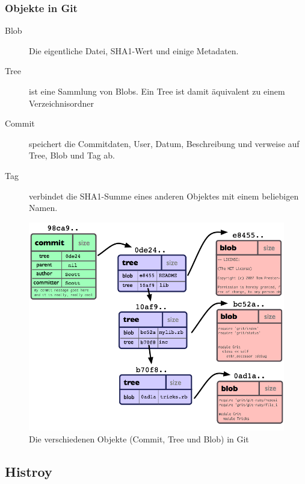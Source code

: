 \documentclass{beamer}
\begin{document}
\begin{frame}\frametitle{Objekte in Git}
\begin{description}
\item[Blob] Die eigentliche Datei, SHA1-Wert und einige Metadaten.
\item[Tree] ist eine Sammlung von Blobs. Ein Tree ist damit äquivalent zu einem Verzeichnisordner
\item[Commit] speichert die Commitdaten, User, Datum, Beschreibung und verweise auf Tree, Blob und Tag ab.
\item[Tag] verbindet die SHA1-Summe eines anderen Objektes mit einem beliebigen Namen. 
\end{description}

\begin{figure}
\includegraphics[scale=0.35]{Bilder/objects-example} 
{\tiny \caption{Die verschiedenen Objekte (Commit, Tree und Blob) in Git}}
\end{figure}
\end{frame}

\subsection{Histroy}
\end{document}
